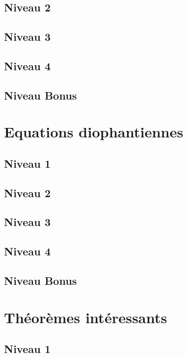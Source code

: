 \documentclass[a4paper]{report}
\begin{document}
			\subsection{Niveau 2}
		
			\subsection{Niveau 3}
			
			\subsection{Niveau 4}
			
			\subsection{Niveau Bonus}
		
		\section{Equations diophantiennes}
		
			\subsection{Niveau 1}
		
			\subsection{Niveau 2}
		
			\subsection{Niveau 3}
			
			\subsection{Niveau 4}
			
			\subsection{Niveau Bonus}
		
		\section{Théorèmes intéressants}
		
			\subsection{Niveau 1}
		
\end{document}
